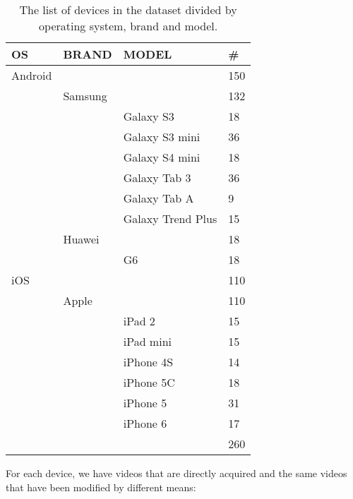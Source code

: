 \begin{table}[]
\centering
\begin{tabular}{|l|l|l|l|}
\hline
\textbf{OS}       & \textbf{BRAND}    & \textbf{MODEL}             & \textbf{\#}			 \\ \hline
Android &         &                   & 150         \\ \hline
        & Samsung &                   & 132         \\ \hline
        &         & Galaxy S3         & 18          \\ \hline
        &         & Galaxy S3 mini    & 36          \\ \hline
        &         & Galaxy S4 mini    & 18          \\ \hline
        &         & Galaxy Tab 3      & 36          \\ \hline
        &         & Galaxy Tab A      & 9           \\ \hline
        &         & Galaxy Trend Plus & 15          \\ \hline
        & Huawei  &                   & 18          \\ \hline
        &         & G6                & 18          \\ \hline
iOS     &         &                   & 110         \\ \hline
        & Apple   &                   & 110         \\ \hline
        &         & iPad 2            & 15          \\ \hline
        &         & iPad mini         & 15          \\ \hline
        &         & iPhone 4S         & 14          \\ \hline
        &         & iPhone 5C         & 18          \\ \hline
        &         & iPhone 5          & 31          \\ \hline
        &         & iPhone 6          & 17          \\ \hline
        &         &                   & 260         \\ \hline

\end{tabular}
\caption{The list of devices in the dataset divided by operating system, brand and model.}
\label{devices}
\end{table}


For each device, we have videos that are directly acquired and the same videos that have been modified by different means:


